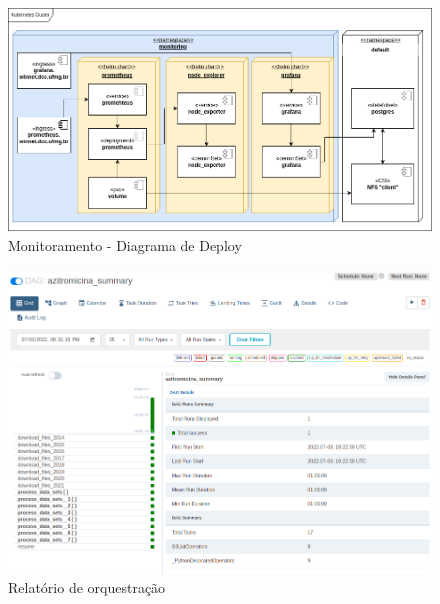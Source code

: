 \documentclass[10pt,brazil]{beamer}
\theoremstyle{definition}
\begin{document}
\begin{frame}[plain]
  \hspace*{-10mm}
  \begin{figure}
    \centering  
  \includegraphics[width=.85\paperwidth]{tcc_monitoring_deploy.png}
      \caption[Monitoramento deploy]{Monitoramento - Diagrama de Deploy}
  \end{figure}  
\end{frame}


\begin{frame}[plain]
  \hspace*{-10mm}
  \begin{figure}
    \centering  
  \includegraphics[width=.7\paperwidth]{report_execution_summary.png}
      \caption[Airflow relatório]{Relatório de orquestração}
  \end{figure}  
\end{frame}
\end{document}
